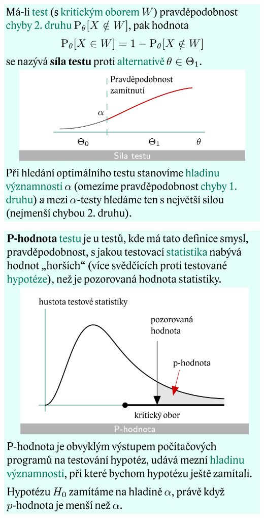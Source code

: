 \documentclass[12pt,a4paper]{article}
\begin{document}
	\includegraphics[scale=0.4]{img/testovani_hypotez_6}
\begin{center}
	\includegraphics[scale=0.5]{img/testovani_hypotez_7}
\end{center}
\end{document}
